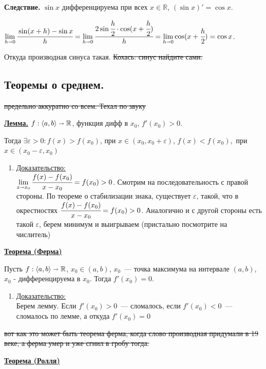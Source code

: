 \documentclass{article}
\newcommand{\thmm}[1]{\underline{\textbf{#1}}}
\newcommand{\prooff}[1]{{\underline{Доказательство:}} \\ }
\begin{document}
\textbf{Следствие.} $\sin x$ дифференцируема при всех $x \in \mathbb{R}$, $(\sin x)' = \cos x$.

$\lim\limits_{h\shortrightarrow 0} \cfrac{\sin(x+h) -\sin x}{h} = \lim\limits_{h \shortrightarrow 0} \cfrac{2 \sin \cfrac{h}{2}\cdot \cos (x+ \cfrac{h}{2})}{h} = \lim \limits_{h\shortrightarrow 0} \cos (x+\cfrac{h}{2}) = \cos x$.

Откуда производная синуса такая. \sout{Кохась: синус найдите сами.}

\pagebreak
\subsection{Теоремы о среднем.}

\sout{предельно аккуратно со всем. Техал по звуку}

\thmm{Лемма.} $f: \langle a,b \rangle \shortrightarrow \mathbb{R}$, функция дифф в $x_0$, $f'(x_0)>0$.

Тогда $\exists \varepsilon>0 : f(x) >f(x_0)$, при $x\in (x_0,x_0 + \varepsilon)$, $f(x)< f(x_0),$ при $x \in (x_0-\varepsilon,x_0)$

\begin{enumerate}
    \item[] \prooff{}
    $\lim\limits_{x \shortrightarrow x_0} \cfrac{f(x)-f(x_0)}{x-x_0}= f(x_0)>0$. Смотрим на последовательность с правой стороны. По теореме о стабилизации знака, существует $\varepsilon$, такой, что  в окрестностях $\cfrac{f(x)-f(x_0)}{x-x_0}= f(x_0)>0$. Аналогично и с другой стороны есть такой $
    \varepsilon$, берем минимум и выигрываем (пристально посмотрите на числитель)
 
\end{enumerate}

\thmm{Теорема (Ферма)}

Пусть $f: \langle a,b\rangle \shortrightarrow \mathbb{R}$, $x_0 \in (a,b)$, $x_0$~--- точка максимума на интервале $(a,b)$, $x_0$ - дифференцируема в $x_0$. Тогда $f'(x_0) = 0$.

\begin{enumerate}
    \item[] \prooff{}
    Берем лемму. Если $f'(x_0) > 0$~--- сломалось, если $f'(x_0)<0$~--- сломалось по лемме, а откуда $f'(x_0) =0$

\end{enumerate}
\sout{вот как это может быть теорема ферма, когда слово производная придумали в 19 веке, а ферма умер и уже сгнил в гробу тогда.}

\thmm{Теорема (Ролля)} 
\end{document}
